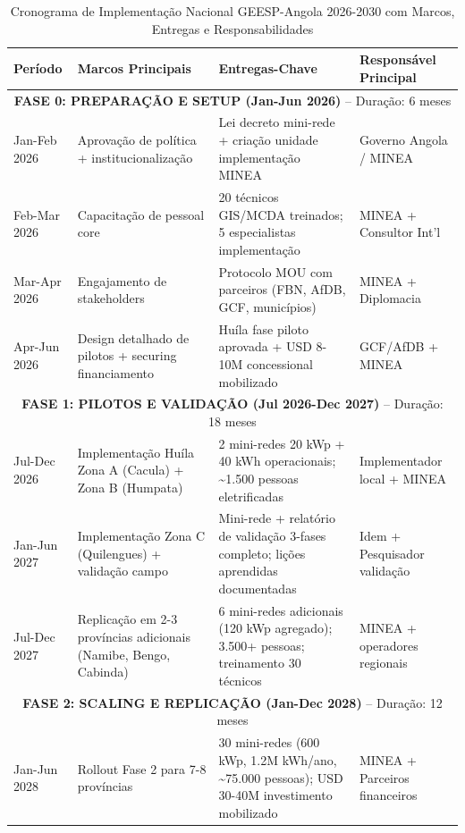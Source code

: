 \documentclass[12pt, a4paper]{article}
\begin{document}
\begin{table}[H]
\centering
\caption{Cronograma de Implementação Nacional GEESP-Angola 2026-2030 com Marcos, Entregas e Responsabilidades}
\label{tab:timeline_national}
\small
\begin{tabular}{p{1.2cm}|p{3.2cm}|p{2.8cm}|p{2.5cm}|}
\toprule
\rowcolor{LightBlue}\textbf{Período} & \textbf{Marcos Principais} & \textbf{Entregas-Chave} & \textbf{Responsável Principal} \\
\midrule
\multicolumn{4}{c}{\textbf{FASE 0: PREPARAÇÃO E SETUP (Jan-Jun 2026)} -- Duração: 6 meses} \\
\midrule
Jan-Feb 2026 & Aprovação de política + institucionalização & Lei decreto mini-rede + criação unidade implementação MINEA & Governo Angola / MINEA \\
\midrule
Feb-Mar 2026 & Capacitação de pessoal core & 20 técnicos GIS/MCDA treinados; 5 especialistas implementação & MINEA + Consultor Int'l \\
\midrule
Mar-Apr 2026 & Engajamento de stakeholders & Protocolo MOU com parceiros (FBN, AfDB, GCF, municípios) & MINEA + Diplomacia \\
\midrule
Apr-Jun 2026 & Design detalhado de pilotos + securing financiamento & Huíla fase piloto aprovada + USD 8-10M concessional mobilizado & GCF/AfDB + MINEA \\
\midrule
\multicolumn{4}{c}{\textbf{FASE 1: PILOTOS E VALIDAÇÃO (Jul 2026-Dec 2027)} -- Duração: 18 meses} \\
\midrule
Jul-Dec 2026 & Implementação Huíla Zona A (Cacula) + Zona B (Humpata) & 2 mini-redes 20 kWp + 40 kWh operacionais; \textasciitilde{}1.500 pessoas eletrificadas & Implementador local + MINEA \\
\midrule
Jan-Jun 2027 & Implementação Zona C (Quilengues) + validação campo & Mini-rede + relatório de validação 3-fases completo; lições aprendidas documentadas & Idem + Pesquisador validação \\
\midrule
Jul-Dec 2027 & Replicação em 2-3 províncias adicionais (Namibe, Bengo, Cabinda) & 6 mini-redes adicionais (120 kWp agregado); 3.500+ pessoas; treinamento 30 técnicos & MINEA + operadores regionais \\
\midrule
\multicolumn{4}{c}{\textbf{FASE 2: SCALING E REPLICAÇÃO (Jan-Dec 2028)} -- Duração: 12 meses} \\
\midrule
Jan-Jun 2028 & Rollout Fase 2 para 7-8 províncias & 30 mini-redes (600 kWp, 1.2M kWh/ano, \textasciitilde{}75.000 pessoas); USD 30-40M investimento mobilizado & MINEA + Parceiros financeiros \\

\end{tabular}
\end{table}
\end{document}
